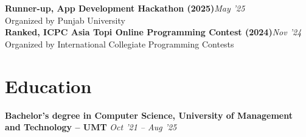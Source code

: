 \documentclass[10pt, letterpaper]{article}
\newcommand{\awardrow}[3]{%
  \noindent\textbf{#1}\hfill{\small\color{lightgray}\textit{#3}}\\
  {\small\color{lightgray}#2}\\[4pt]}
\begin{document}
\awardrow{Runner-up, App Development Hackathon (2025)}{Organized by Punjab University}{May '25}
\awardrow{Ranked, ICPC Asia Topi Online Programming Contest (2024)}{Organized by International Collegiate Programming Contests}{Nov '24}

\section{Education}

\noindent\textbf{Bachelor's degree in Computer Science, University of Management and Technology -- UMT}
\hfill{\small\color{lightgray}\textit{Oct '21 -- Aug '25}}
\end{document}
